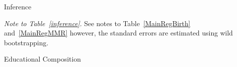\documentclass[a4paper, 11pt]{article}
\begin{document}
\begin{spacing}{1.4}
\begin{table}\caption{Inference} \label{inference}
	
\begin{threeparttable}
	
	{\footnotesize 	}

\begin{tablenotes}
			
\footnotesize
			
\item \textit{Note to Table~\ref{inference}}. See notes to Table~\ref{MainRegBirth} and~\ref{MainRegMMR} however, the standard errors are estimated using wild bootstrapping.  
			
\end{tablenotes} 
		
\end{threeparttable}
	
\end{table} 


 \setcounter{table}{8}

 \begin{table}[H]   \caption{Educational Composition} \label{educ_Birth_mmr}
 	\begin{threeparttable}
 		\begin{subtable}{\columnwidth} \centering {}\label{educ_b}
 			
 			{\small 	}
 		\end{subtable}
 		\begin{subtable}{\columnwidth} \centering {}\label{educ_m}
 			{\small 	}
 		\end{subtable}
 		

\end{threeparttable}
\end{table}
\end{spacing}
\end{document}
